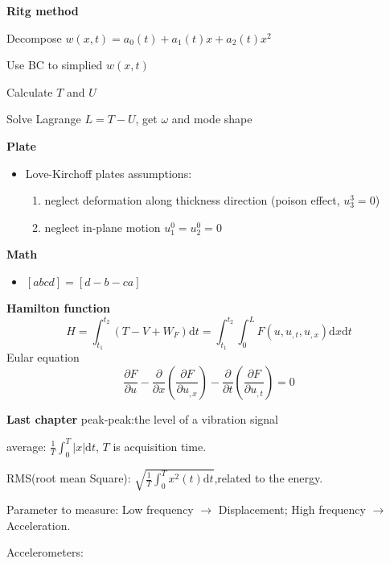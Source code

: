 \documentclass{article}
\begin{document}
\begin{multicols*}{3}
  \noindent\textbf{Ritg method}

 Decompose $w(x,t) = a_0(t) + a_1(t)x + a_2(t)x^2$

Use BC to simplied $w(x,t)$

 Calculate $T$ and $U$

 Solve Lagrange $L = T - U$, get $\omega$ and mode shape


  \noindent\textbf{Plate}
  \begin{itemize}
  \item Love-Kirchoff plates assumptions:
    \begin{enumerate}
    \item neglect deformation along thickness direction (poison effect, $u_3^3=0$)
    \item neglect in-plane motion $u_1^0=u_2^0=0$
    \end{enumerate}
  \end{itemize}

  \noindent\textbf{Math}
  \begin{itemize}
  \item $[a b c d] = [d -b -c a]$
  \end{itemize}



 


 \textbf{Hamilton function}
\begin{equation*}
  H=\int_{t_{1}}^{t_{2}}(T-V+W_{F})\text{d}t
  =\int_{t_{1}}^{t_{2}}\int_{0}^{L}F(u,u_{,t},u_{,x})\text{d}x\text{d}t
\end{equation*}
Eular equation
\begin{equation*}
  \frac{\partial F}{\partial u}-\frac{\partial}{\partial x}(\frac{\partial F}{\partial u_{,x}})-\frac{\partial}{\partial t}(\frac{\partial F}{\partial u_{,t}})=0
\end{equation*}

\noindent\textbf{Last chapter}
peak-peak:the level of a vibration signal

average: $\frac{1}{T}\int_{0}^{T}|x|\text{d}t$, $T$ is acquisition time.

RMS(root mean Square): $\sqrt{\frac{1}{T}\int_{0}^{T}x^{2}(t)\text{d}t}$,related  to the energy.

Parameter to measure: Low frequency $\rightarrow$ Displacement; High frequency $\rightarrow$ Acceleration.

Accelerometers:


\end{multicols*}
\end{document}
